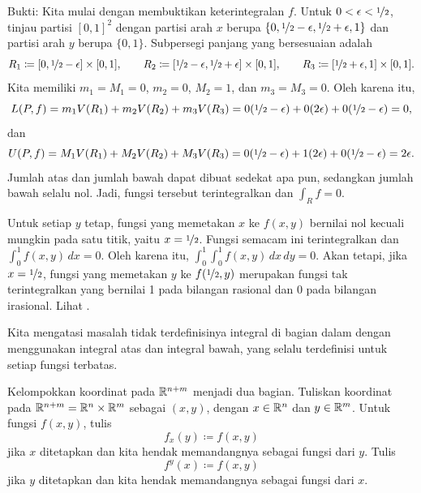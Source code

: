 \begin{example}
Bukti:
Kita mulai dengan membuktikan keterintegralan $f$. Untuk
$0 < \epsilon < \nicefrac{1}{2}$, tinjau partisi $[0,1]^2$ dengan partisi
arah $x$ berupa $\{ 0, \nicefrac{1}{2}-\epsilon,
\nicefrac{1}{2}+\epsilon,1\}$ dan partisi arah $y$ berupa $\{ 0, 1 \}$.
Subpersegi panjang yang bersesuaian adalah
\begin{equation*}
R_1 \coloneqq [0, \nicefrac{1}{2}-\epsilon] \times [0,1],
\qquad
R_2 \coloneqq [\nicefrac{1}{2}-\epsilon,
\nicefrac{1}{2}+\epsilon] \times [0,1],
\qquad
R_3 \coloneqq [\nicefrac{1}{2}+\epsilon,1] \times [0,1] .
\end{equation*}
Kita memiliki $m_1 = M_1 = 0$, $m_2 =0$, $M_2 = 1$, dan
$m_3 = M_3 = 0$. Oleh karena itu,
\begin{equation*}
L(P,f) = 
m_1 V(R_1)
+
m_2 V(R_2)
+
m_3 V(R_3)
=
0 (\nicefrac{1}{2}-\epsilon)
+
0 (2\epsilon)
+
0 (\nicefrac{1}{2}-\epsilon) = 0 ,
\end{equation*}
dan
\begin{equation*}
U(P,f) = 
M_1 V(R_1)
+
M_2 V(R_2)
+
M_3 V(R_3)
=
0 (\nicefrac{1}{2}-\epsilon)
+
1 (2\epsilon)
+
0 (\nicefrac{1}{2}-\epsilon) = 2 \epsilon .
\end{equation*}
Jumlah atas dan jumlah bawah dapat dibuat sedekat apa pun, sedangkan jumlah
bawah selalu nol. Jadi, fungsi tersebut terintegralkan dan $\int_R f = 0$.

Untuk setiap $y$ tetap, fungsi yang memetakan $x$ ke $f(x,y)$ bernilai nol
kecuali mungkin pada satu titik, yaitu $x=\nicefrac{1}{2}$. Fungsi semacam ini
terintegralkan dan $\int_0^1 f(x,y) \, dx = 0$. Oleh karena itu,
$\int_0^1 \int_0^1 f(x,y) \, dx \, dy = 0$. Akan tetapi, jika
$x=\nicefrac{1}{2}$, fungsi yang memetakan $y$ ke
$f(\nicefrac{1}{2},y)$ merupakan fungsi tak terintegralkan yang bernilai 1
pada bilangan rasional dan 0 pada bilangan irasional. Lihat
.
\end{example}

Kita mengatasi masalah tidak terdefinisinya integral di bagian dalam dengan
menggunakan integral atas dan integral bawah, yang selalu terdefinisi untuk
setiap fungsi terbatas.

\medskip

Kelompokkan koordinat pada ${\mathbb{R}}^{n+m}$ menjadi dua bagian. Tuliskan koordinat pada
${\mathbb{R}}^{n+m} = {\mathbb{R}}^n \times {\mathbb{R}}^m$ sebagai $(x,y)$, dengan $x \in {\mathbb{R}}^n$ dan
$y \in {\mathbb{R}}^m$. Untuk fungsi $f(x,y)$, tulis
\begin{equation*}
f_x(y) \coloneqq f(x,y)
\end{equation*}
jika $x$ ditetapkan dan kita hendak memandangnya sebagai fungsi dari $y$.
Tulis
\begin{equation*}
f^y(x) \coloneqq f(x,y)
\end{equation*}
jika $y$ ditetapkan dan kita hendak memandangnya sebagai fungsi dari $x$.

